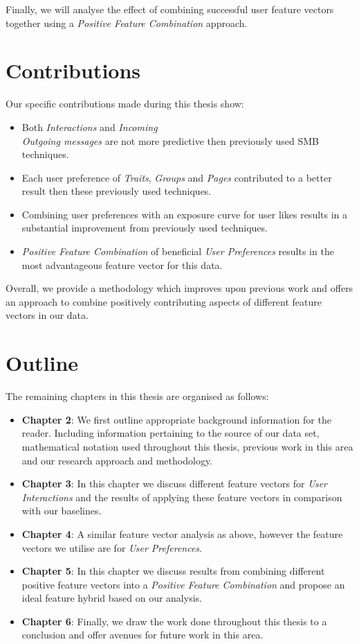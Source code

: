 Finally, we will analyse the effect of combining successful user feature vectors together using a \emph{Positive Feature Combination} 
approach.

\section{Contributions}
\label{sec:contributions}

Our specific contributions made during this thesis show:

\begin{itemize}
\item Both \emph{Interactions} and \emph{Incoming\\Outgoing messages} are not more predictive then previously used SMB
techniques.
\item Each user preference of \emph{Traits}, \emph{Groups} and \emph{Pages} contributed to a better result then these previously used techniques.
\item Combining user preferences with an exposure curve for user likes results in a substantial improvement from previously used techniques.
\item \emph{Positive Feature Combination} of beneficial \emph{User Preferences} results in the most advantageous feature vector for this data.
\end{itemize} 

Overall, we provide a methodology which improves upon previous work and offers an approach to combine positively contributing aspects of different 
feature vectors in our data.

\section{Outline}
\label{sec:outline}

The remaining chapters in this thesis are organised as follows:
\begin{itemize}
\item \textbf{Chapter 2}: We first outline appropriate background information for the reader. Including information pertaining to the source of 
our data set, mathematical notation used throughout this thesis, previous work in this area and our research approach and methodology.
\item \textbf{Chapter 3}: In this chapter we discuss different feature vectors for \emph{User Interactions} and the results of applying these feature vectors 
in comparison with our baselines.
\item \textbf{Chapter 4}: A similar feature vector analysis as above, however the feature vectors we utilise are for \emph{User Preferences}.
\item \textbf{Chapter 5}: In this chapter we discuss results from combining different positive feature vectors into a \emph{Positive Feature Combination}
and propose an ideal feature hybrid based on our analysis.
\item \textbf{Chapter 6}: Finally, we draw the work done throughout this thesis to a conclusion and offer avenues for future work in this area.
\end{itemize}

